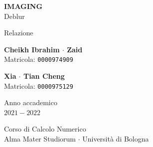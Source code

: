 \documentclass[11pt]{article}
\begin{document}
\graphicspath{ {./img/} }
\begin{titlepage}
    \begin{center}
        \vspace*{1.5cm}
            
        \Huge
        \textbf{IMAGING} \\
        \LARGE
        Deblur
            
        \vspace{0.5cm}
        \LARGE
        Relazione
            
        \vspace{1.5cm}
          
        \begin{minipage}[t]{0.47\textwidth}
        \begin{center}
        	{\large{\bf Cheikh Ibrahim $\cdot$ Zaid}}\\
			{\large Matricola: \texttt{0000974909}}
        \end{center}

		\end{minipage}
		\hfill
		\begin{minipage}[t]{0.47\textwidth}\raggedleft
		\begin{center}
        	{\large{\bf Xia $\cdot$ Tian Cheng}}\\
			{\large Matricola: \texttt{0000975129}}
        \end{center}
		\end{minipage}  
            
        \vspace{6cm}
            
        Anno accademico\\
        $2021 - 2022$
            
        \vspace{0.8cm}
            
            
        \Large
        Corso di Calcolo Numerico\\
        Alma Mater Studiorum $\cdot$ Università di Bologna\\
            
    \end{center}
\end{titlepage}
\pagebreak
\end{document}
